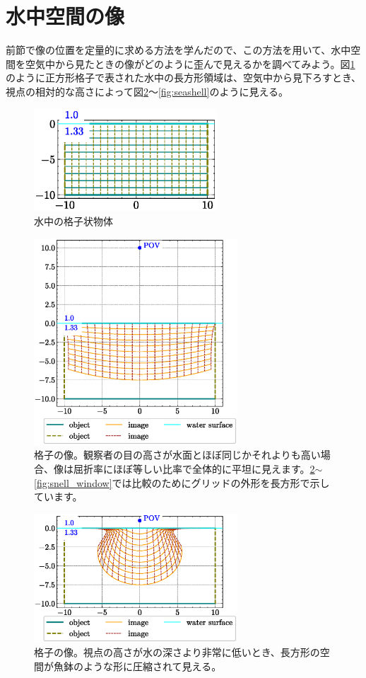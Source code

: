 \documentclass[twocolumn]{article}
\begin{document}
\section{水中空間の像}

前節で像の位置を定量的に求める方法を学んだので、この方法を用いて、水中空間を空気中から見たときの像がどのように歪んで見えるかを調べてみよう。図\ref{fig:grid_underwater}のように正方形格子で表された水中の長方形領域は、空気中から見下ろすとき、視点の相対的な高さによって図\ref{fig:image_underwater}〜\ref{fig:seashell}のように見える。

\begin{figure}[!h]
	\centering
	\includegraphics[width=2.7in]{figs/grid_underwater.eps}
	\caption{水中の格子状物体}
	\label{fig:grid_underwater}
\end{figure}

\begin{figure}[!t]
	\centering
	\includegraphics[width=3in]{figs/image_underwater1.eps}
	\caption{格子の像。観察者の目の高さが水面とほぼ同じかそれよりも高い場合、像は屈折率にほぼ等しい比率で全体的に平坦に見えます。\ref{fig:image_underwater}$\sim$\ref{fig:snell_window}では比較のためにグリッドの外形を長方形で示しています。}
	\label{fig:image_underwater}
\end{figure}

\begin{figure}[!t]
	\centering
	\includegraphics[width=3in]{figs/fishjar.eps}
	\caption{格子の像。視点の高さが水の深さより非常に低いとき、長方形の空間が魚鉢のような形に圧縮されて見える。}
	\label{fig:fishbowl}
\end{figure}
\end{document}
